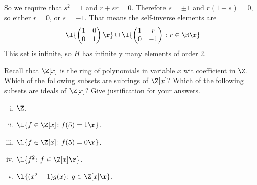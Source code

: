\documentclass[a4paper]{article}
\begin{document}
So we require that $s^2 = 1$ and $r + sr = 0$. Therefore $s = \pm 1$ and $r(1+s) = 0$, so either $r=0$, or $s = -1$. That means the self-inverse elements are \[
\l\{ \begin{pmatrix} 1 & 0 \\ 0 & 1 \end{pmatrix} \r\}
\cup \l\{ \begin{pmatrix} 1 & r \\ 0 & -1 \end{pmatrix} \colon r \in \R \r\}
\]
This set is infinite, so $H$ has infinitely many elements of order 2.


\renewcommand{\thesubsection}{Q\arabic{section}~(\roman{subsection})}

\begin{questionbody}
Recall that $\Z[x]$ is the ring of polynomials in variable $x$ wit coefficient in $\Z$. Which of the following subsets are subrings of $\Z[x]$? Which of the following subsets are ideals of $\Z[x]$? Give justification for your answers.
\begin{enumerate}[(i)]
\item $\Z$.
\item $\l\{ f \in \Z[x] \colon f(5) = 1 \r\}$.
\item $\l\{ f \in \Z[x] \colon f(5) = 0 \r\}$.
\item $\l\{ f^2 \colon f \in \Z[x] \r\}$.
\item $\l\{ (x^2 + 1) g(x) \colon g \in \Z[x] \r\}$.
\end{enumerate}
\end{questionbody}

\subsection{~} %
\subsection{~} %
\subsection{~} %
\subsection{~} %
\subsection{~} %
\end{document}

